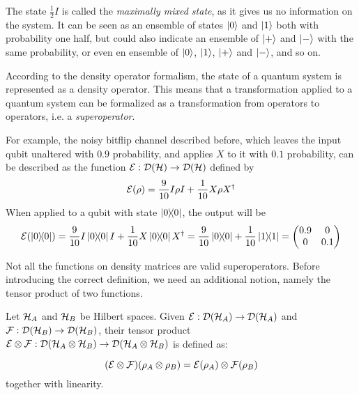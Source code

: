The state $\frac{1}{2}I$ is called the \textit{maximally mixed state}, as it gives us no information on the system. It can be seen as an ensemble of states $\ket{0}$ and $\ket{1}$ both with probability one half, but could also indicate an ensemble of $\ket{+}$ and $\ket{-}$ with the same probability, or even en ensemble of $\ket{0}$, $\ket{1}$, $\ket{+}$ and $\ket{-}$, and so on. 


According to the density operator formalism, the state of a quantum system is represented as a density operator. This means that a transformation applied to a quantum system can be formalized as a transformation from operators to operators, i.e. a \textit{superoperator}.

For example, the noisy bitflip channel described before, which leaves the input qubit unaltered with $0.9$ probability, and applies $X$ to it with $0.1$ probability, can be described as the function $\mathcal{E}: \mathcal{D}(\mathcal{H}) \rightarrow \mathcal{D}(\mathcal{H})$ defined by
\[\mathcal{E}(\rho) = \frac{9}{10} 
I\rho I
+
\frac{1}{10}
X \rho X^\dagger
\]
When applied to a qubit with state $\ket{0}\!\!\bra{0}$, the output will be 
\[\sop(\proj{0}) = \frac{9}{10} I \proj{0} I + \frac{1}{10}X \proj{0} X^\dagger = \frac{9}{10} \proj{0} + \frac{1}{10}\proj{1} = 
\begin{pmatrix} 0.9 & 0 \\ 0 & 0.1 \end{pmatrix} \]

Not all the functions on density matrices are valid superoperators. Before introducing the correct definition, we need an additional notion, namely the tensor product of two functions.


Let $\mathcal{H}_A$ and $\mathcal{H}_B$ be Hilbert spaces. Given $\mathcal{E}: \mathcal{D}(\mathcal{H}_A) \rightarrow \mathcal{D}(\mathcal{H}_A)$ and $\mathcal{F}: \mathcal{D}(\mathcal{H}_B) \rightarrow \mathcal{D}(\mathcal{H}_B)$,  their tensor product $\mathcal{E}\otimes \mathcal{F}: \mathcal{D}(\mathcal{H}_A \otimes \mathcal{H}_B)\rightarrow \mathcal{D}(\mathcal{H}_A \otimes \mathcal{H}_B)$ is defined as:

\[
	(\mathcal{E} \otimes \mathcal{F})(\rho_A \otimes \rho_B) = \mathcal{E}(\rho_A)\otimes \mathcal{F}(\rho_B)
\]
together with linearity.


